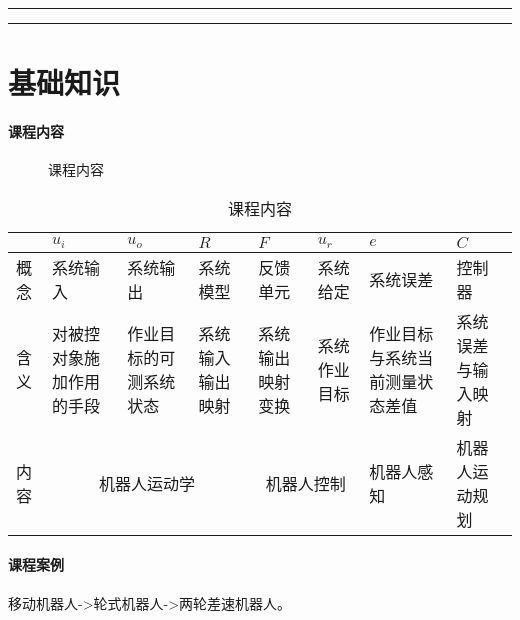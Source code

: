 \documentclass[
12pt, %
a4paper, 
oneside, %
headinclude,footinclude, %
]{scrartcl}
\title{\normalfont\spacedallcaps{智能工程}}
\date{}
\begin{document}
\maketitle
\newpage
\hypertarget{toc}{}
\begingroup
\begin{multicols}{2}
\tableofcontents
\end{multicols}
\endgroup
\hrule
\begingroup
\begin{multicols}{2}
\listoffigures
\end{multicols}
\endgroup
\hrule
\begingroup
\begin{multicols}{2}
\listoftables
\end{multicols}
\endgroup
\newpage
\listoftips
\newpage
\section{基础知识}
\paragraph{课程内容}
\begin{figure}[H]
\centering
{} \quad
{}
\caption{课程内容}
\end{figure}

\begin{table}[H]
\centering
\begin{tabular}{|p{0.5cm}|p{2cm}|p{2cm}|p{2cm}|p{2cm}|p{2cm}|p{2cm}|p{2cm}|}
\hline
& $ u_i $ & $ u_o $ & $ R $ & $ F $ & $ u_r $ & $ e $ & $ C $ \\
\hline
概念 & 系统输入 & 系统输出 & 系统模型 & 反馈单元 & 系统给定 & 系统误差 & 控制器 \\
\hline
含义 & 对被控对象施加作用的手段 & 作业目标的可测系统状态 & 系统输入输出映射 & 系统输出映射变换 & 系统作业目标 & 作业目标与系统当前测量状态差值 & 系统误差与输入映射 \\
\hline
内容 & \multicolumn{3}{c|}{机器人运动学} & \multicolumn{2}{c|}{机器人控制} & 机器人感知 & 机器人运动规划 \\
\hline
\end{tabular}
\caption{课程内容}
\end{table}
\paragraph{课程案例}\label{sec:two_wheel}
移动机器人->轮式机器人->两轮差速机器人。
\end{document}
